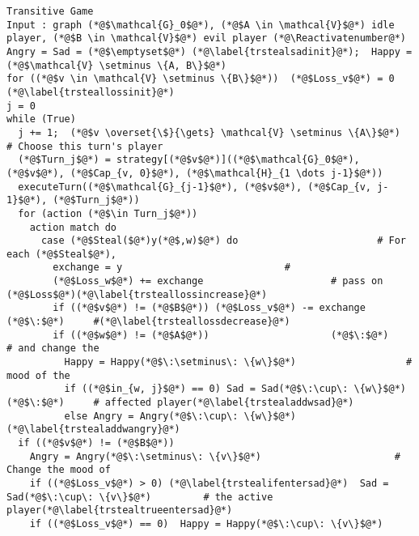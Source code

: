 \Suppressnumber
\begin{lstlisting}[label=transitivegame, style=numbers]
Transitive Game
Input : graph (*@$\mathcal{G}_0$@*), (*@$A \in \mathcal{V}$@*) idle player, (*@$B \in \mathcal{V}$@*) evil player (*@\Reactivatenumber@*)
Angry = Sad = (*@$\emptyset$@*) (*@\label{trstealsadinit}@*);  Happy = (*@$\mathcal{V} \setminus \{A, B\}$@*)
for ((*@$v \in \mathcal{V} \setminus \{B\}$@*))  (*@$Loss_v$@*) = 0 (*@\label{trsteallossinit}@*)
j = 0
while (True)
  j += 1;  (*@$v \overset{\$}{\gets} \mathcal{V} \setminus \{A\}$@*)              # Choose this turn's player
  (*@$Turn_j$@*) = strategy[(*@$v$@*)]((*@$\mathcal{G}_0$@*), (*@$v$@*), (*@$Cap_{v, 0}$@*), (*@$\mathcal{H}_{1 \dots j-1}$@*))
  executeTurn((*@$\mathcal{G}_{j-1}$@*), (*@$v$@*), (*@$Cap_{v, j-1}$@*), (*@$Turn_j$@*))
  for (action (*@$\in Turn_j$@*))
    action match do
      case (*@$Steal($@*)y(*@$,w)$@*) do                        # For each (*@$Steal$@*),
        exchange = y                            #
        (*@$Loss_w$@*) += exchange                      # pass on (*@$Loss$@*)(*@\label{trsteallossincrease}@*)
        if ((*@$v$@*) != (*@$B$@*)) (*@$Loss_v$@*) -= exchange    (*@$\:$@*)     #(*@\label{trsteallossdecrease}@*)
        if ((*@$w$@*) != (*@$A$@*))                     (*@$\:$@*)      # and change the
          Happy = Happy(*@$\:\setminus\: \{w\}$@*)                   # mood of the
          if ((*@$in_{w, j}$@*) == 0) Sad = Sad(*@$\:\cup\: \{w\}$@*)  (*@$\:$@*)     # affected player(*@\label{trstealaddwsad}@*)
          else Angry = Angry(*@$\:\cup\: \{w\}$@*)   (*@\label{trstealaddwangry}@*)
  if ((*@$v$@*) != (*@$B$@*))
    Angry = Angry(*@$\:\setminus\: \{v\}$@*)                       # Change the mood of
    if ((*@$Loss_v$@*) > 0) (*@\label{trstealifentersad}@*)  Sad = Sad(*@$\:\cup\: \{v\}$@*)         # the active player(*@\label{trstealtrueentersad}@*)
    if ((*@$Loss_v$@*) == 0)  Happy = Happy(*@$\:\cup\: \{v\}$@*)
\end{lstlisting}
